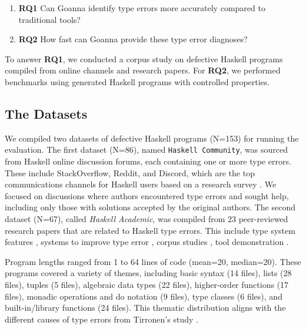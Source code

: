 \documentclass[pdflatex,lineno,sn-nature,Numbered]{sn-jnl}%
\begin{document}
\begin{enumerate}
    \item \textbf{RQ1} Can Goanna identify type errors more accurately compared to traditional tools?
    \item \textbf{RQ2} How fast can Goanna provide these type error diagnoses?
\end{enumerate}

To answer {\bf RQ1}, we conducted a corpus study on defective Haskell programs compiled from online channels and research papers. For {\bf RQ2}, we performed benchmarks using generated Haskell programs with controlled properties.

\subsection{The Datasets} \label{sub:dataset}

We compiled two datasets of defective Haskell programs (N=153) for running the evaluation. The first dataset (N=86), named \texttt{Haskell Community}, was sourced from Haskell online discussion forums, each containing one or more type errors. These include StackOverflow, Reddit, and Discord, which are the top communications channels for Haskell users based on a research survey \cite{Fausak2022-zf}. We focused on discussions where authors encountered type errors and sought help, including only those with solutions accepted by the original authors. The second dataset (N=67), called \textit{Haskell Academic}, was compiled from 23 peer-reviewed research papers that are related to Haskell type errors. This include type system features \cite{Chargueraud2015-km,Haack2004-fr,Bhanuka2023-qv,Lee1998-fx}, systems to improve type error \cite{Zhang2015-xy,Zhang2017-tj,Chen2014-dz,Chen2020-ad,Chen2022-xb,Seidel2017-uf,Tsushima2021-es,Wu2017-ws,Fu2023-fm,Stuckey2003-pz,Chen2017-fc,Stuckey2004-fb,Lerner2007-yq,Pavlinovic2014-rw}, corpus studies \cite{Wu2017-eb,Tirronen2015-nr,Nemeth2019-pv}, tool demonstration \cite{Heeren2003-kd,Stuckey2003-lo}.

Program lengths ranged from 1 to 64 lines of code (mean=20, median=20). These programs covered a variety of themes, including basic syntax (14 files), lists (28 files), tuples (5 files), algebraic data types (22 files), higher-order functions (17 files), monadic operations and do notation (9 files), type classes (6 files), and built-in/library functions (24 files). This thematic distribution aligns with the different causes of type errors from Tirronen's study \cite{Tirronen2015-nr}.
\end{document}
